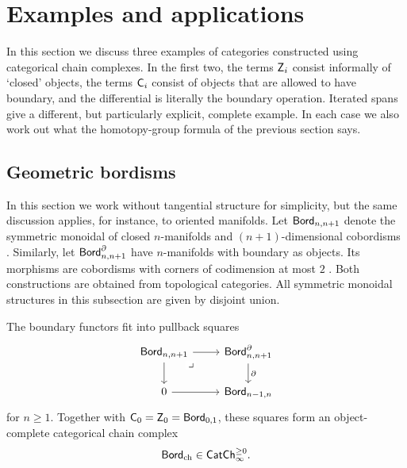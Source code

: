 \documentclass[a4paper,11pt]{article}
\begin{document}
\section{Examples and applications}
\label{sec:examples}

In this section we discuss  three examples of categories constructed using categorical chain complexes. In the first two, the terms $\textup{\textsf{Z}}_i$ consist informally of `closed'
objects, the terms $\textup{\textsf{C}}_i$ consist of objects that are allowed to have
boundary, and the differential is literally the boundary operation.
Iterated spans give a different, but particularly explicit, complete
example.  In each case we also work out what the homotopy-group formula
of the previous section says.

\subsection{Geometric bordisms}
\label{sec:geometric-bordisms}

In this section we work without tangential structure for simplicity, but the same discussion applies, for instance, to oriented manifolds.
Let $\textup{\textsf{Bord}}_{n,n+1}$ denote the symmetric monoidal \icat{} of closed
$n$-manifolds and $(n+1)$-dimensional cobordisms \cite{GMTW}.
Similarly, let
$\textup{\textsf{Bord}}^{\partial}_{n,n+1}$ have $n$-manifolds with boundary as
objects.  Its morphisms are cobordisms with corners of codimension at
most $2$ \cite{Genauer}.  Both constructions are obtained from
topological categories.  All symmetric monoidal structures in this
subsection are given by disjoint union.

\begin{propn}\label{propn:geometric bordism chain complex}
  The boundary functors fit into pullback squares
  \[
    \begin{tikzcd}
      \Bord_{n,n+1} \drpullback \ar[r] \ar[d]
        & \Bord^{\partial}_{n,n+1} \ar[d,"\partial"] \\
      0 \ar[r] & \Bord_{n-1,n}
    \end{tikzcd}
  \]
  for $n\geq1$.  Together with
  $\textup{\textsf{C}}_0=\textup{\textsf{Z}}_0=\textup{\textsf{Bord}}_{0,1}$, these squares form an
  object-complete categorical chain complex
  \[
    \textup{\textsf{Bord}}_{\mathrm{ch}}\in\textup{\textsf{CatCh}}^{\geq 0}_{\infty}.
  \]
\end{propn}
\end{document}
